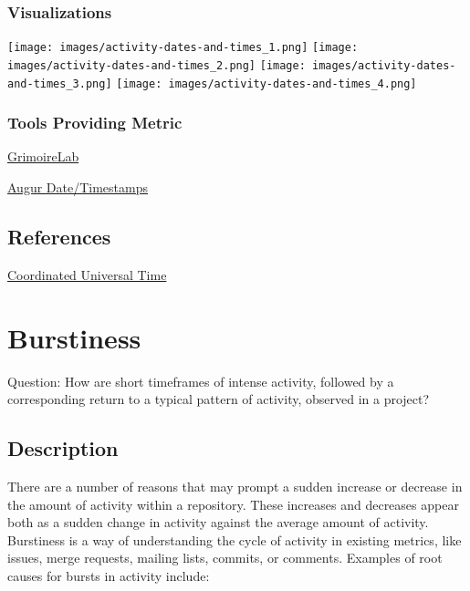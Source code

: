 \documentclass[
  12pt,
]{article}
\begin{document}
\hypertarget{visualizations-1}{%
\subsubsection{Visualizations}\label{visualizations-1}}

\texttt{[image: images/activity-dates-and-times\_1.png]}
\texttt{[image: images/activity-dates-and-times\_2.png]}
\texttt{[image: images/activity-dates-and-times\_3.png]}
\texttt{[image: images/activity-dates-and-times\_4.png]}

\hypertarget{tools-providing-metric}{%
\subsubsection{Tools Providing Metric}\label{tools-providing-metric}}

\href{https://chaoss.github.io/grimoirelab/}{GrimoireLab}

\href{https://docs.augur.net/\#dates-timestamps}{Augur Date/Timestamps}

\hypertarget{references-2}{%
\subsection{References}\label{references-2}}

\href{https://en.wikipedia.org/wiki/Coordinated_Universal_Time}{Coordinated
Universal Time}

\hypertarget{burstiness}{%
\section{Burstiness}\label{burstiness}}

Question: How are short timeframes of intense activity, followed by a
corresponding return to a typical pattern of activity, observed in a
project?

\hypertarget{description-3}{%
\subsection{Description}\label{description-3}}

There are a number of reasons that may prompt a sudden increase or
decrease in the amount of activity within a repository. These increases
and decreases appear both as a sudden change in activity against the
average amount of activity. Burstiness is a way of understanding the
cycle of activity in existing metrics, like issues, merge requests,
mailing lists, commits, or comments. Examples of root causes for bursts
in activity include:
\end{document}
